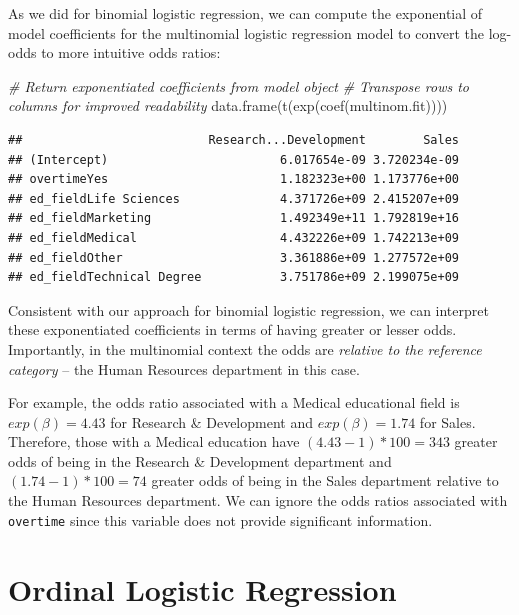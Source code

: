 \documentclass[
]{book}
\newenvironment{Shaded}{\begin{snugshade}}{\end{snugshade}}
\newcommand{\CommentTok}[1]{\textcolor[rgb]{0.56,0.35,0.01}{\textit{#1}}}
\newcommand{\FunctionTok}[1]{\textcolor[rgb]{0.00,0.00,0.00}{#1}}
\newcommand{\NormalTok}[1]{#1}
\begin{document}
As we did for binomial logistic regression, we can compute the exponential of model coefficients for the multinomial logistic regression model to convert the log-odds to more intuitive odds ratios:

\begin{Shaded}
\begin{Highlighting}[]
\CommentTok{\# Return exponentiated coefficients from model object}
\CommentTok{\# Transpose rows to columns for improved readability}
\FunctionTok{data.frame}\NormalTok{(}\FunctionTok{t}\NormalTok{(}\FunctionTok{exp}\NormalTok{(}\FunctionTok{coef}\NormalTok{(multinom.fit))))}
\end{Highlighting}
\end{Shaded}

\begin{verbatim}
##                          Research...Development        Sales
## (Intercept)                        6.017654e-09 3.720234e-09
## overtimeYes                        1.182323e+00 1.173776e+00
## ed_fieldLife Sciences              4.371726e+09 2.415207e+09
## ed_fieldMarketing                  1.492349e+11 1.792819e+16
## ed_fieldMedical                    4.432226e+09 1.742213e+09
## ed_fieldOther                      3.361886e+09 1.277572e+09
## ed_fieldTechnical Degree           3.751786e+09 2.199075e+09
\end{verbatim}

Consistent with our approach for binomial logistic regression, we can interpret these exponentiated coefficients in terms of having greater or lesser odds. Importantly, in the multinomial context the odds are \emph{relative to the reference category} -- the Human Resources department in this case.

For example, the odds ratio associated with a Medical educational field is \(exp(\beta) = 4.43\) for Research \& Development and \(exp(\beta) = 1.74\) for Sales. Therefore, those with a Medical education have \((4.43 - 1) * 100 = 343%
\) greater odds of being in the Research \& Development department and \((1.74 - 1) * 100 = 74%
\) greater odds of being in the Sales department relative to the Human Resources department. We can ignore the odds ratios associated with \texttt{overtime} since this variable does not provide significant information.

\hypertarget{ordinal-logistic-regression}{%
\section{Ordinal Logistic Regression}\label{ordinal-logistic-regression}}
\end{document}

